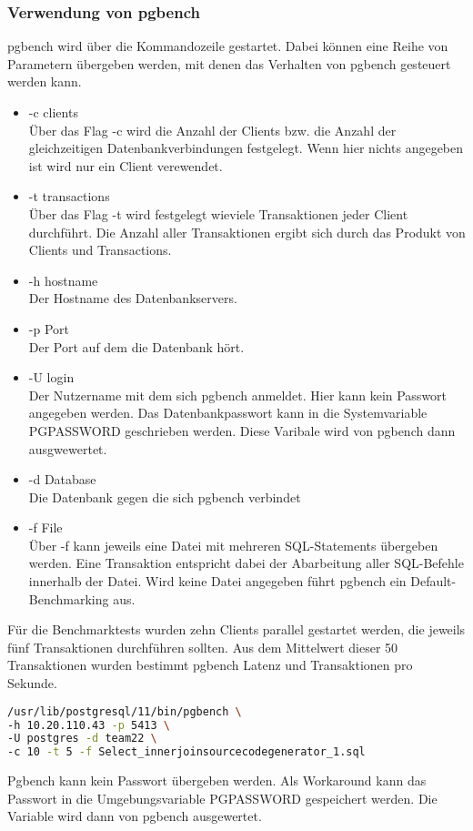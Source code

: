 \subsubsection{Verwendung von pgbench}
pgbench wird über die Kommandozeile gestartet. Dabei können eine Reihe von Parametern übergeben werden, mit denen das Verhalten von pgbench gesteuert werden kann.
\begin{itemize}
	\item -c clients  \\
	Über das Flag -c wird die Anzahl der Clients bzw. die Anzahl der gleichzeitigen Datenbankverbindungen festgelegt. Wenn hier nichts angegeben ist wird nur ein Client verewendet.
	\item -t transactions \\
	Über das Flag -t wird festgelegt wieviele Transaktionen jeder Client durchführt. Die Anzahl aller Transaktionen ergibt sich durch das Produkt von Clients und Transactions.
	\item -h hostname \\
	Der Hostname des Datenbankservers.
	\item -p Port \\
	Der Port auf dem die Datenbank hört.
	\item -U login \\
	Der Nutzername mit dem sich pgbench anmeldet. Hier kann kein Passwort angegeben werden. Das Datenbankpasswort kann in die Systemvariable PGPASSWORD geschrieben werden. Diese Varibale wird von pgbench dann ausgwewertet.
	\item -d Database \\
	Die Datenbank gegen die sich pgbench verbindet
	\item -f File \\ 
	Über -f kann jeweils eine Datei mit mehreren SQL-Statements übergeben werden. Eine Transaktion entspricht dabei der Abarbeitung aller SQL-Befehle innerhalb der Datei.
	Wird keine Datei angegeben führt pgbench ein Default-Benchmarking aus.

\end{itemize}
Für die Benchmarktests wurden zehn Clients parallel gestartet werden, die jeweils fünf Transaktionen durchführen sollten. Aus dem Mittelwert dieser 50 Transaktionen wurden bestimmt pgbench Latenz und Transaktionen pro Sekunde.

\begin{lstlisting}[language=bash,caption = pgbench Statment,frame=single, label={2.pgbench.listing} ]
/usr/lib/postgresql/11/bin/pgbench \ 
-h 10.20.110.43 -p 5413 \ 
-U postgres -d team22 \ 
-c 10 -t 5 -f Select_innerjoinsourcecodegenerator_1.sql
\end{lstlisting}
Pgbench kann kein Passwort übergeben werden. Als Workaround kann das Passwort in die Umgebungsvariable PGPASSWORD gespeichert werden. Die Variable wird dann von pgbench ausgewertet. 
